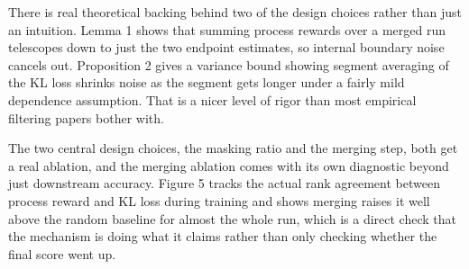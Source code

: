 \documentclass[11pt,a4paper]{article}
\begin{document}
There is real theoretical backing behind two of the design choices rather than just an intuition. Lemma 1 shows that summing process rewards over a merged run telescopes down to just the two endpoint estimates, so internal boundary noise cancels out. Proposition 2 gives a variance bound showing segment averaging of the KL loss shrinks noise as the segment gets longer under a fairly mild dependence assumption. That is a nicer level of rigor than most empirical filtering papers bother with.

The two central design choices, the masking ratio and the merging step, both get a real ablation, and the merging ablation comes with its own diagnostic beyond just downstream accuracy. Figure 5 tracks the actual rank agreement between process reward and KL loss during training and shows merging raises it well above the random baseline for almost the whole run, which is a direct check that the mechanism is doing what it claims rather than only checking whether the final score went up.
\end{document}
